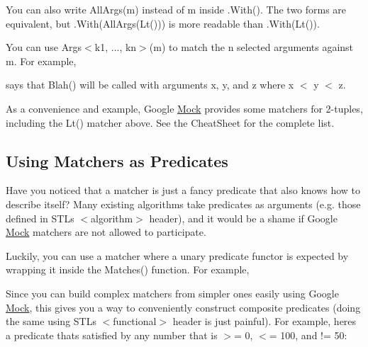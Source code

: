 You can also write {\ttfamily All\+Args(m)} instead of {\ttfamily m} inside {\ttfamily .With()}. The two forms are equivalent, but {\ttfamily .With(All\+Args(\+Lt()))} is more readable than {\ttfamily .With(\+Lt())}.

You can use {\ttfamily Args$<$k1, ..., kn$>$(m)} to match the {\ttfamily n} selected arguments against {\ttfamily m}. For example,


\begin{DoxyCode}{0}
\end{DoxyCode}


says that {\ttfamily Blah()} will be called with arguments {\ttfamily x}, {\ttfamily y}, and {\ttfamily z} where {\ttfamily x $<$ y $<$ z}.

As a convenience and example, Google \mbox{\hyperlink{class_mock}{Mock}} provides some matchers for 2-\/tuples, including the {\ttfamily Lt()} matcher above. See the Cheat\+Sheet for the complete list.

\subsection*{Using Matchers as Predicates}

Have you noticed that a matcher is just a fancy predicate that also knows how to describe itself? Many existing algorithms take predicates as arguments (e.\+g. those defined in S\+TL\textquotesingle{}s {\ttfamily $<$algorithm$>$} header), and it would be a shame if Google \mbox{\hyperlink{class_mock}{Mock}} matchers are not allowed to participate.

Luckily, you can use a matcher where a unary predicate functor is expected by wrapping it inside the {\ttfamily Matches()} function. For example,


\begin{DoxyCode}{0}
\DoxyCodeLine{}
\end{DoxyCode}


Since you can build complex matchers from simpler ones easily using Google \mbox{\hyperlink{class_mock}{Mock}}, this gives you a way to conveniently construct composite predicates (doing the same using S\+TL\textquotesingle{}s {\ttfamily $<$functional$>$} header is just painful). For example, here\textquotesingle{}s a predicate that\textquotesingle{}s satisfied by any number that is $>$= 0, $<$= 100, and != 50\+:


